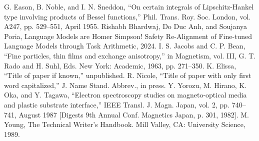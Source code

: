 \documentclass[conference]{IEEEtran}
\begin{document}
\begin{thebibliography}{00}
 G. Eason, B. Noble, and I. N. Sneddon, ``On certain integrals of Lipschitz-Hankel type involving products of Bessel functions,'' Phil. Trans. Roy. Soc. London, vol. A247, pp. 529--551, April 1955.
 Rishabh Bhardwaj, Do Duc Anh, and Soujanya Poria, Language Models are Homer Simpson! Safety Re-Alignment of Fine-tuned Language Models through Task Arithmetic, 2024.
 I. S. Jacobs and C. P. Bean, ``Fine particles, thin films and exchange anisotropy,'' in Magnetism, vol. III, G. T. Rado and H. Suhl, Eds. New York: Academic, 1963, pp. 271--350.
 K. Elissa, ``Title of paper if known,'' unpublished.
 R. Nicole, ``Title of paper with only first word capitalized,'' J. Name Stand. Abbrev., in press.
 Y. Yorozu, M. Hirano, K. Oka, and Y. Tagawa, ``Electron spectroscopy studies on magneto-optical media and plastic substrate interface,'' IEEE Transl. J. Magn. Japan, vol. 2, pp. 740--741, August 1987 [Digests 9th Annual Conf. Magnetics Japan, p. 301, 1982].
 M. Young, The Technical Writer's Handbook. Mill Valley, CA: University Science, 1989.
\end{thebibliography}
\end{document}
